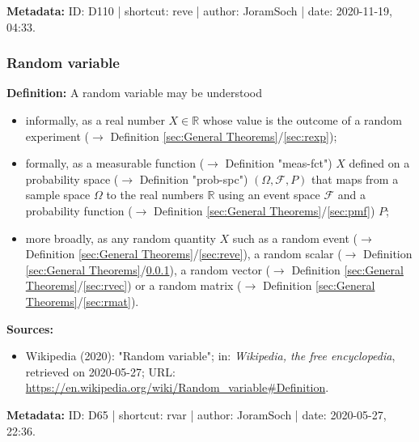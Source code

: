 \documentclass[a4paper,12pt,twoside]{book}
\begin{document}
\vspace{1em}
\textbf{Metadata:} ID: D110 | shortcut: reve | author: JoramSoch | date: 2020-11-19, 04:33.
\vspace{1em}



\subsubsection[\textit{Random variable}]{Random variable} \label{sec:rvar}
\setcounter{equation}{0}

\textbf{Definition:} A random variable may be understood

\begin{itemize}

\item informally, as a real number $X \in \mathbb{R}$ whose value is the outcome of a random experiment ($\rightarrow$ Definition \ref{sec:General Theorems}/\ref{sec:rexp});

\item formally, as a measurable function ($\rightarrow$ Definition "meas-fct") $X$ defined on a probability space ($\rightarrow$ Definition "prob-spc") $(\Omega, \mathcal{F}, P)$ that maps from a sample space $\Omega$ to the real numbers $\mathbb{R}$ using an event space $\mathcal{F}$ and a probability function ($\rightarrow$ Definition \ref{sec:General Theorems}/\ref{sec:pmf}) $P$;

\item more broadly, as any random quantity $X$ such as a random event ($\rightarrow$ Definition \ref{sec:General Theorems}/\ref{sec:reve}), a random scalar ($\rightarrow$ Definition \ref{sec:General Theorems}/\ref{sec:rvar}), a random vector ($\rightarrow$ Definition \ref{sec:General Theorems}/\ref{sec:rvec}) or a random matrix ($\rightarrow$ Definition \ref{sec:General Theorems}/\ref{sec:rmat}).

\end{itemize}


\vspace{1em}
\textbf{Sources:}
\begin{itemize}
\item Wikipedia (2020): "Random variable"; in: \textit{Wikipedia, the free encyclopedia}, retrieved on 2020-05-27; URL: \url{https://en.wikipedia.org/wiki/Random_variable#Definition}.
\end{itemize}


\vspace{1em}
\textbf{Metadata:} ID: D65 | shortcut: rvar | author: JoramSoch | date: 2020-05-27, 22:36.
\vspace{1em}
\end{document}
